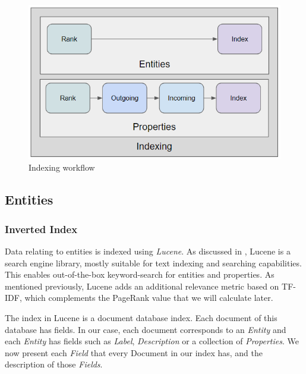 \begin{figure}[H]
    \centering
        \includegraphics[width=0.7\linewidth]{imagenes/Indexing.png}
        \caption{Indexing workflow}
        \label{fig:indexing}
\end{figure}

\subsection{Entities}

\subsubsection{Inverted Index}

Data relating to entities is indexed using \textit{Lucene}. 
As discussed in , Lucene is a search engine library, mostly suitable for text indexing and searching capabilities. 
This enables out-of-the-box keyword-search for entities and properties.
As mentioned previously, Lucene adds an additional relevance metric based on TF-IDF, which complements the PageRank value that we will calculate later.

The index in Lucene is a document database index. 
Each document of this database has fields. 
In our case, each document corresponds to an \textit{Entity} and each \textit{Entity} has fields such as \textit{Label}, \textit{Description} or a collection of \textit{Properties}. 
We now present each \textit{Field} that every Document in our index has, and the description of those \textit{Fields}.


